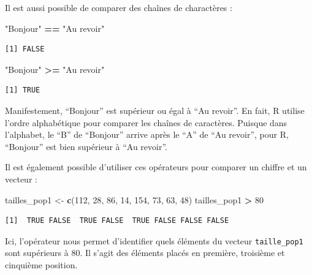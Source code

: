 \documentclass[a4paperpaper,]{article}
\newenvironment{Shaded}{\begin{snugshade}}{\end{snugshade}}
\newcommand{\KeywordTok}[1]{\textcolor[rgb]{0.13,0.29,0.53}{\textbf{#1}}}
\newcommand{\DecValTok}[1]{\textcolor[rgb]{0.00,0.00,0.81}{#1}}
\newcommand{\StringTok}[1]{\textcolor[rgb]{0.31,0.60,0.02}{#1}}
\newcommand{\OperatorTok}[1]{\textcolor[rgb]{0.81,0.36,0.00}{\textbf{#1}}}
\newcommand{\NormalTok}[1]{#1}
\theoremstyle{definition}
\theoremstyle{definition}
\theoremstyle{definition}
\theoremstyle{remark}
\begin{document}
Il est aussi possible de comparer des chaînes de charactères :

\begin{Shaded}
\begin{Highlighting}[]
\StringTok{"Bonjour"} \OperatorTok{==}\StringTok{ "Au revoir"}
\end{Highlighting}
\end{Shaded}

\begin{verbatim}
[1] FALSE
\end{verbatim}

\begin{Shaded}
\begin{Highlighting}[]
\StringTok{"Bonjour"} \OperatorTok{>=}\StringTok{ "Au revoir"}
\end{Highlighting}
\end{Shaded}

\begin{verbatim}
[1] TRUE
\end{verbatim}

Manifestement, ``Bonjour'' est supérieur ou égal à ``Au revoir''. En
fait, R utilise l'ordre alphabétique pour comparer les chaînes de
caractères. Puisque dans l'alphabet, le ``B'' de ``Bonjour'' arrive
après le ``A'' de ``Au revoir'', pour R, ``Bonjour'' est bien supérieur
à ``Au revoir''.

Il est également possible d'utiliser ces opérateurs pour comparer un
chiffre et un vecteur :

\begin{Shaded}
\begin{Highlighting}[]
\NormalTok{tailles_pop1 <-}\StringTok{ }\KeywordTok{c}\NormalTok{(}\DecValTok{112}\NormalTok{, }\DecValTok{28}\NormalTok{, }\DecValTok{86}\NormalTok{, }\DecValTok{14}\NormalTok{, }\DecValTok{154}\NormalTok{, }\DecValTok{73}\NormalTok{, }\DecValTok{63}\NormalTok{, }\DecValTok{48}\NormalTok{)}
\NormalTok{tailles_pop1 }\OperatorTok{>}\StringTok{ }\DecValTok{80}
\end{Highlighting}
\end{Shaded}

\begin{verbatim}
[1]  TRUE FALSE  TRUE FALSE  TRUE FALSE FALSE FALSE
\end{verbatim}

Ici, l'opérateur nous permet d'identifier quels éléments du vecteur
\texttt{taille\_pop1} sont supérieurs à 80. Il s'agit des éléments
placés en première, troisième et cinquième position.
\end{document}
